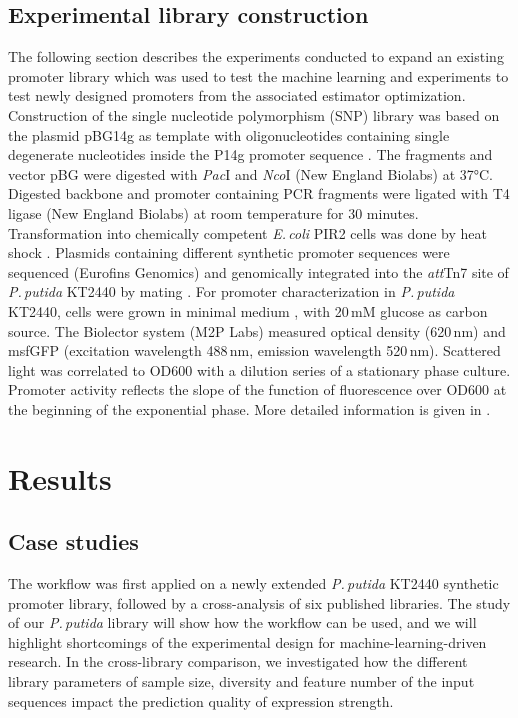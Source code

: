 \documentclass[utf8]{frontiersSCNS} %
\begin{document}
\subsection{Experimental library construction}
The following section describes the experiments conducted to expand an existing promoter library \citep{Kobbing2020} which was used to test the machine learning and experiments to test newly designed promoters from the associated estimator optimization. Construction of the single nucleotide polymorphism (SNP) library was based on the plasmid pBG14g as template with oligonucleotides containing single degenerate nucleotides inside the P14g promoter sequence \citep{Zobel2015,Kobbing2020}. The fragments and vector pBG were digested with \textit{Pac}I and \textit{Nco}I (New England Biolabs) at 37°C. Digested backbone and promoter containing PCR fragments were ligated with T4 ligase (New England Biolabs) at room temperature for 30 minutes. Transformation into chemically competent \textit{E.\,coli} PIR2 cells was done by heat shock \citep{Hanahan1983}. Plasmids containing different synthetic promoter sequences were sequenced (Eurofins Genomics) and genomically integrated into the \textit{att}Tn7 site of \textit{P.\,putida} KT2440 by mating \citep{Zobel2015}. For promoter characterization in \textit{P.\,putida} KT2440, cells were grown in minimal medium \citep{Hartmans1989}, with 20\,mM glucose as carbon source. The Biolector system (M2P Labs) measured optical density (620\,nm) and msfGFP (excitation wavelength 488\,nm, emission wavelength 520\,nm). Scattered light was correlated to OD600 with a dilution series of a stationary phase culture. Promoter activity reflects the slope of the function of fluorescence over OD600 at the beginning of the exponential phase. More detailed information is given in \cite{Kobbing2020}.


\section{Results}
\subsection{Case studies}
The workflow was first applied on a newly extended \textit{P.\,putida} KT2440 synthetic promoter library, followed by a cross-analysis of six published libraries. The study of our \textit{P.\,putida} library will show how the workflow can be used, and we will highlight shortcomings of the experimental design for machine-learning-driven research. In the cross-library comparison, we investigated how the different library parameters of sample size, diversity and feature number of the input sequences impact the prediction quality of expression strength. 
\end{document}
